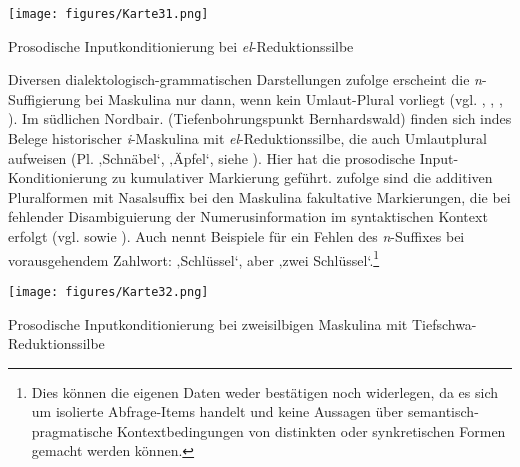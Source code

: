 \begin{map}
\texttt{[image: figures/Karte31.png]}
\caption{Prosodische Inputkonditionierung bei \textit{el}{}-Reduktionssilbe}
\label{map:31}
\end{map}

Diversen dialektologisch-grammatischen Darstellungen zufolge erscheint die \textit{n}{}-Suffigierung bei Maskulina nur dann, wenn kein Umlaut-Plural vorliegt (vgl. \citealt[158]{Rowley1997}, \citealt[421]{Schirmunski1962}, \citealt[§801]{Schmeller1821}, \citealt[§11e]{Weitzenböck1942}). Im südlichen Nordbair. (Tiefenbohrungspunkt Bernhardswald) finden sich indes Belege historischer \textit{i}{}-Maskulina mit \textit{el}{}-Reduktionssilbe, die auch Umlautplural aufweisen (Pl.  ‚Schnäbel‘,  ‚Äpfel‘, siehe ). Hier hat die prosodische Input-Konditionierung zu kumulativer Markierung geführt. \citet[153]{Rowley1997} zufolge sind die additiven Pluralformen mit Nasalsuffix bei den Maskulina fakultative Markierungen, die bei fehlender Disambiguierung der Numerusinformation im syntaktischen Kontext erfolgt (vgl. \citealt[158]{Rowley1997} sowie ). Auch \citet[421]{Schirmunski1962} nennt Beispiele für ein Fehlen des \textit{n}{}-Suffixes bei vorausgehendem Zahlwort:  ‚Schlüssel‘, aber   ‚zwei Schlüssel‘.\footnote{Dies können die eigenen Daten weder bestätigen noch widerlegen, da es sich um isolierte Abfrage-Items handelt und keine Aussagen über semantisch-pragmatische Kontextbedingungen von distinkten oder synkretischen Formen gemacht werden können.}



\begin{map}
\texttt{[image: figures/Karte32.png]}
  \caption{Prosodische Inputkonditionierung bei zweisilbigen Maskulina mit Tiefschwa-Reduktionssilbe}
  \label{map:32}
\end{map}

